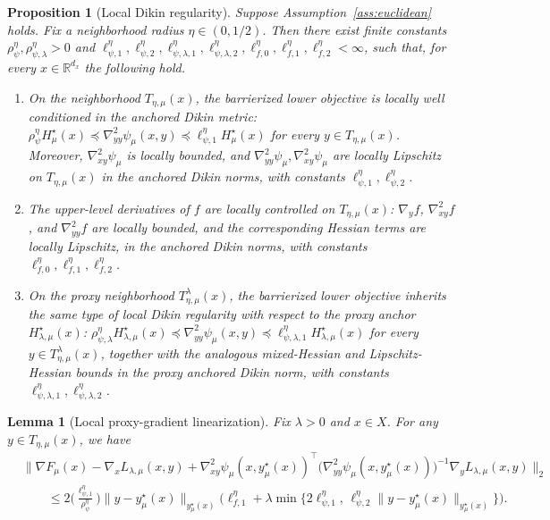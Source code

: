 \documentclass[10pt,a4paper]{amsart}
\newtheorem{proposition}{Proposition}
\newtheorem{lemma}{Lemma}
\begin{document}
\begin{proposition}[Local Dikin regularity]
\label{prop:derived_dikin_regularity}
Suppose Assumption~\ref{ass:euclidean} holds. Fix a neighborhood radius
\(\eta\in(0,1/2)\). Then there exist finite constants
\(\rho_{\psi}^{\eta},\rho_{\psi,\lambda}^{\eta}>0\) and
\(\ell_{\psi,1}^{\eta},\ell_{\psi,2}^{\eta},
\ell_{\psi,\lambda,1}^{\eta},\ell_{\psi,\lambda,2}^{\eta},
\ell_{f,0}^{\eta},\ell_{f,1}^{\eta},\ell_{f,2}^{\eta}<\infty\),
such that, for every \(x\in\mathbb R^{d_x}\) the following hold.
\begin{enumerate}[leftmargin=*]
\item[\textup{(i)}]
On the neighborhood \(T_{\eta,\mu}(x)\), the barrierized lower objective is locally well conditioned in
the anchored Dikin metric:
\(\rho_{\psi}^{\eta}H_\mu^\star(x)\preceq
\nabla_{yy}^2\psi_\mu(x,y)\preceq
\ell_{\psi,1}^{\eta}H_\mu^\star(x)\) for every \(y\in T_{\eta,\mu}(x)\).
Moreover, \(\nabla_{xy}^2\psi_\mu\) is locally bounded, and
\(\nabla_{yy}^2\psi_\mu,\nabla_{xy}^2\psi_\mu\) are locally Lipschitz on
\(T_{\eta,\mu}(x)\) in the anchored Dikin norms, with constants
\(\ell_{\psi,1}^{\eta},\ell_{\psi,2}^{\eta}\).

\item[\textup{(ii)}]
The upper-level derivatives of \(f\) are locally controlled on \(T_{\eta,\mu}(x)\):
\(\nabla_y f\), \(\nabla_{xy}^2 f\), and \(\nabla_{yy}^2 f\) are locally bounded, and the
corresponding Hessian terms are locally Lipschitz, in the anchored Dikin norms, with constants
\(\ell_{f,0}^{\eta},\ell_{f,1}^{\eta},\ell_{f,2}^{\eta}\).

\item[\textup{(iii)}]
On the proxy neighborhood \(T_{\eta,\mu}^{\lambda}(x)\), the barrierized lower objective inherits the same
type of local Dikin regularity with respect to the proxy anchor \(H_{\lambda,\mu}^\star(x)\):
\(\rho_{\psi,\lambda}^{\eta}H_{\lambda,\mu}^\star(x)\preceq
\nabla_{yy}^2\psi_\mu(x,y)\preceq
\ell_{\psi,\lambda,1}^{\eta}H_{\lambda,\mu}^\star(x)\) for every
\(y\in T_{\eta,\mu}^{\lambda}(x)\), together with the analogous mixed-Hessian and
Lipschitz-Hessian bounds in the proxy anchored Dikin norm, with constants
\(\ell_{\psi,\lambda,1}^{\eta},\ell_{\psi,\lambda,2}^{\eta}\).
\end{enumerate}
\end{proposition}

\begin{lemma}[Local proxy-gradient linearization]
\label{lem:proxy_direction_linearization}
Fix \(\lambda>0\) and \(x\in X\). For any \(y\in T_{\eta,\mu}(x)\), we have
\begin{align}
&\Big\|
\nabla F_\mu(x)
-\nabla_x L_{\lambda,\mu}(x,y)
+\nabla^2_{xy}\psi_\mu(x,y_\mu^\star(x))^\top
\big(\nabla^2_{yy}\psi_\mu(x,y_\mu^\star(x))\big)^{-1}
\nabla_y L_{\lambda,\mu}(x,y)
\Big\|_2
\nonumber\\
&\qquad\le
2\Big(\frac{\ell_{\psi,1}^\eta}{\rho_\psi^\eta}\Big)
\|y-y_\mu^\star(x)\|_{y_\mu^\star(x)}
\Big(
\ell_{f,1}^\eta
+
\lambda\min\{
2\ell_{\psi,1}^\eta,\,
\ell_{\psi,2}^\eta\|y-y_\mu^\star(x)\|_{y_\mu^\star(x)}
\}
\Big).
\label{eq:proxy_linearization_bound}
\end{align}
\end{lemma}
\end{document}
